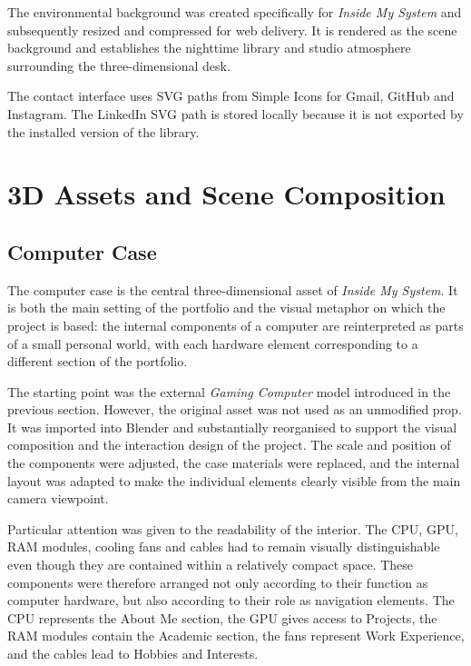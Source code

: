 \documentclass{report}
\begin{document}
The environmental background was created specifically for
\textit{Inside My System} and subsequently resized and compressed for
web delivery. It is rendered as the scene background and establishes
the nighttime library and studio atmosphere surrounding the
three-dimensional desk.

The contact interface uses SVG paths from Simple Icons for Gmail,
GitHub and Instagram. The LinkedIn SVG path is stored locally because
it is not exported by the installed version of the library.

\section{3D Assets and Scene Composition}

\subsection{Computer Case}

The computer case is the central three-dimensional asset of
\textit{Inside My System}. It is both the main setting of the portfolio
and the visual metaphor on which the project is based: the internal
components of a computer are reinterpreted as parts of a small personal
world, with each hardware element corresponding to a different section
of the portfolio.

The starting point was the external \textit{Gaming Computer} model
introduced in the previous section. However, the original asset was not
used as an unmodified prop. It was imported into Blender and
substantially reorganised to support the visual composition and the
interaction design of the project. The scale and position of the
components were adjusted, the case materials were replaced, and the
internal layout was adapted to make the individual elements clearly
visible from the main camera viewpoint.

Particular attention was given to the readability of the interior. The
CPU, GPU, RAM modules, cooling fans and cables had to remain visually
distinguishable even though they are contained within a relatively
compact space. These components were therefore arranged not only
according to their function as computer hardware, but also according to
their role as navigation elements. The CPU represents the About Me
section, the GPU gives access to Projects, the RAM modules contain the
Academic section, the fans represent Work Experience, and the cables
lead to Hobbies and Interests.
\end{document}
